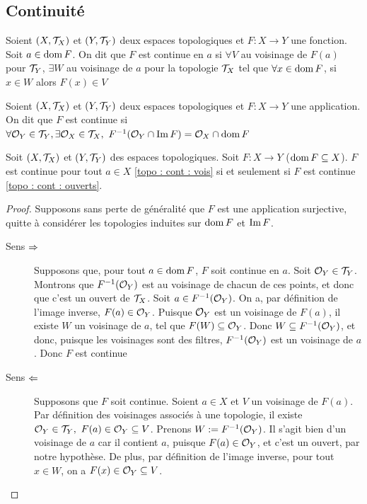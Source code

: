 \subsection{Continuité}
    
\begin{definition}\label{topo : cont : vois}
    Soient $(X,\mathcal{T}_X)$ et $(Y,\mathcal{T}_Y)$ deux espaces topologiques et $F:X\to Y$ une fonction. Soit $a\in\operatorname{dom} F$. On dit que $F$ est continue en $a$ si
    $\forall V$ au voisinage de $F(a)$ pour $\mathcal{T}_Y$, $\exists W$ au voisinage de $a$ pour la topologie $\mathcal{T}_X$ tel que $\forall x\in \operatorname{dom} F$, si $x\in W$ alors $F(x)\in V$
\end{definition}
\begin{definition}\label{topo : cont : ouverts}
   Soient $(X,\mathcal{T}_X)$ et $(Y,\mathcal{T}_Y)$ deux espaces topologiques et $F:X\to Y$ une application. On dit que $F$ est continue si $\forall \ouvert_Y\in\topologie_Y,\exists \ouvert_X\in\topologie_X,\ F^{-1}(\ouvert_Y\cap\im F) = \ouvert_X\cap \dom F$
\end{definition}
\begin{proposition}
     Soit $(X, \mathcal{T}_X)$ et $ (Y, \mathcal{T}_Y) $ des espaces topologiques. Soit $F:X\to Y$ ($\operatorname{dom} F \subseteq X$). $F$ est continue pour tout $a\in X$ \ref{topo : cont : vois} si et seulement si $F$ est continue \ref{topo : cont : ouverts}.
\end{proposition}
\begin{proof}
    Supposons sans perte de généralité que $F$ est une application surjective, quitte à considérer les topologies induites sur $\operatorname{dom} F$ et $\operatorname{Im} F$.
    \begin{description}
        \item[Sens $\Rightarrow$] Supposons que, pour tout $a\in\operatorname{dom} F$, $F$ soit continue en $a$. Soit $\mathcal{O}_Y\in \mathcal{T}_Y$. Montrons que $F^{-1}(\mathcal{O}_Y)$ est au voisinage de chacun de ces points, et donc que c'est un ouvert de $\mathcal{T}_X$. Soit $a\in F^{-1}(\mathcal{O}_Y)$. On a, par définition de l'image inverse, $F(a)\in\mathcal{O}_Y$. Puisque $\mathcal{O}_Y$ est un voisinage de $F(a)$, il existe $W$ un voisinage de $a$, tel que $F(W)\subseteq \mathcal{O}_Y$. Donc $W\subseteq F^{-1}(\mathcal{O}_Y)$, et donc, puisque les voisinages sont des filtres, $F^{-1}(\mathcal{O}_Y)$ est un voisinage de $a$. Donc $F$ est continue
        \item[Sens $\Leftarrow$] Supposons que $F$ soit continue. Soient $a\in X$ et $V$ un voisinage de $F(a)$. Par définition des voisinages associés à une topologie, il existe $\ouvert_Y\in\topologie_Y,\ F(a)\in\ouvert_Y\subseteq V$.  Prenons $W:=F^{-1}(\mathcal{O}_Y)$. Il s'agit bien d'un voisinage de $a$ car il contient $a$, puisque $F(a)\in\mathcal{O}_Y$, et c'est un ouvert, par notre hypothèse. De plus, par définition de l'image inverse, pour tout $x\in W$, on a $F(x)\in\mathcal{O}_Y\subseteq V$.
    \end{description}
\end{proof}


